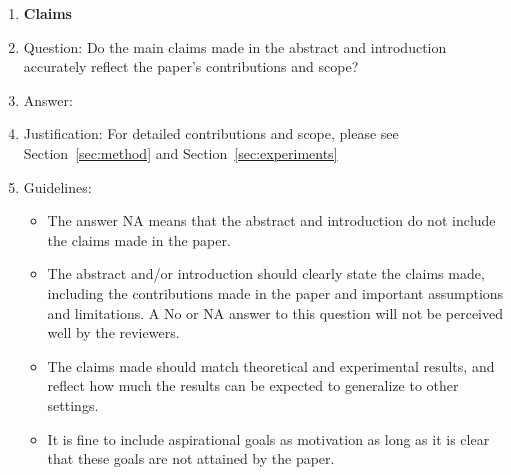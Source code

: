 \begin{enumerate}

\item {\bf Claims}
    \item[] Question: Do the main claims made in the abstract and introduction accurately reflect the paper's contributions and scope?
    \item[] Answer:  \answerYes{} %
    \item[] Justification: For detailed contributions and scope, please see Section~\ref{sec:method} and Section~\ref{sec:experiments}%
    \item[] Guidelines:
    \begin{itemize}
        \item The answer NA means that the abstract and introduction do not include the claims made in the paper.
        \item The abstract and/or introduction should clearly state the claims made, including the contributions made in the paper and important assumptions and limitations. A No or NA answer to this question will not be perceived well by the reviewers. 
        \item The claims made should match theoretical and experimental results, and reflect how much the results can be expected to generalize to other settings. 
        \item It is fine to include aspirational goals as motivation as long as it is clear that these goals are not attained by the paper. 
    \end{itemize}


\end{enumerate}
